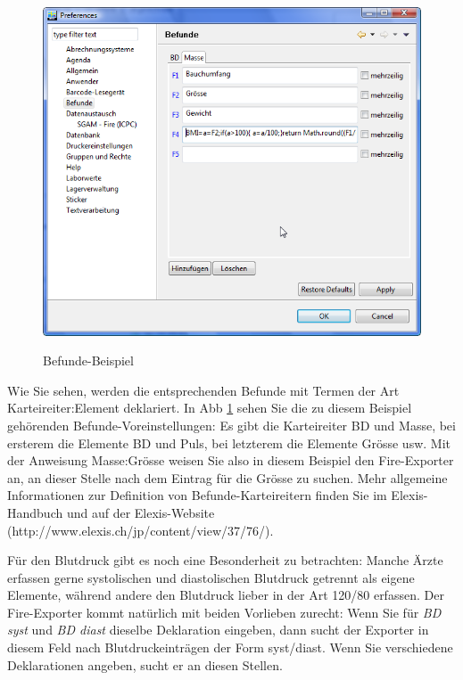 \documentclass[a4paper]{scrartcl}
\begin{document}
\begin{figure}
  \includegraphics{fire2}\\
  \caption{Befunde-Beispiel}\label{fire:fig2}
\end{figure}

Wie Sie sehen, werden die entsprechenden Befunde mit Termen der Art Karteireiter:Element  deklariert. In Abb \ref{fire:fig2} sehen Sie die zu diesem Beispiel gehörenden Befunde-Voreinstellungen: Es gibt die Karteireiter BD und Masse, bei ersterem die Elemente BD und Puls, bei letzterem die Elemente Grösse usw. Mit der Anweisung Masse:Grösse weisen Sie also in diesem Beispiel den Fire-Exporter an, an dieser Stelle nach dem Eintrag für die Grösse zu suchen. Mehr allgemeine Informationen zur Definition von Befunde-Karteireitern finden Sie im Elexis-Handbuch und auf der Elexis-Website (http://www.elexis.ch/jp/content/view/37/76/).

\medskip

Für den Blutdruck gibt es noch eine Besonderheit zu betrachten: Manche Ärzte erfassen gerne systolischen und diastolischen Blutdruck getrennt als eigene Elemente, während andere den Blutdruck lieber in der Art 120/80 erfassen. Der Fire-Exporter kommt natürlich mit beiden Vorlieben zurecht: Wenn Sie für \textit{BD syst} und \textit{BD diast} dieselbe Deklaration eingeben, dann sucht der Exporter in diesem Feld nach Blutdruckeinträgen der Form syst/diast. Wenn Sie verschiedene Deklarationen angeben, sucht er an diesen Stellen.
\end{document}
